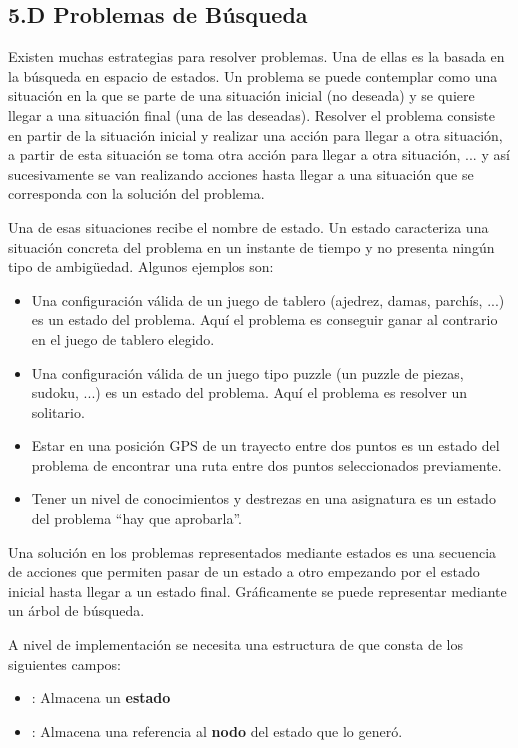 \subsection*{5.D Problemas de Búsqueda}\label{subsec:problemasbusqueda}

Existen muchas estrategias para resolver problemas. 
Una de ellas es la basada en la búsqueda en espacio de estados.
Un problema se puede contemplar como una situación en la que se parte de una situación inicial (no deseada) y se quiere llegar a una situación final (una de las deseadas).
Resolver el problema consiste en partir de la situación inicial y realizar una acción para llegar a otra situación, a partir de esta situación se toma otra acción para llegar a otra situación, ... y así sucesivamente se van realizando acciones hasta llegar a una situación que se corresponda con la solución del problema.

Una de esas situaciones recibe el nombre de estado. 
Un estado caracteriza una situación concreta del problema en un instante de tiempo y  no presenta ningún tipo de ambigüedad. Algunos ejemplos son:
\begin{itemize}
\item Una configuración válida de un juego de tablero (ajedrez, damas, parchís, ...)
es un estado del problema. Aquí el problema es conseguir ganar al contrario en el juego de tablero elegido.
\item Una configuración válida de un juego tipo puzzle (un puzzle de piezas, sudoku, ...)
es un estado del problema. Aquí el problema es resolver un solitario.
\item Estar en una posición GPS de un trayecto entre dos puntos es un estado del problema de encontrar una ruta entre dos puntos seleccionados previamente.
\item Tener un nivel de conocimientos y destrezas en una asignatura es un estado del problema ``hay que aprobarla''.
\end{itemize}

Una solución en los problemas representados mediante estados es una secuencia de acciones que permiten pasar de un estado a otro empezando por el estado inicial hasta llegar a un estado final. Gráficamente se puede representar mediante un árbol de búsqueda.

A nivel de implementación se necesita una estructura de  que consta de los siguientes campos:

\begin{itemize}
\item {}: Almacena un \textbf{estado}
\item {}: Almacena una referencia al \textbf{nodo} del estado que lo generó.
\end{itemize}




